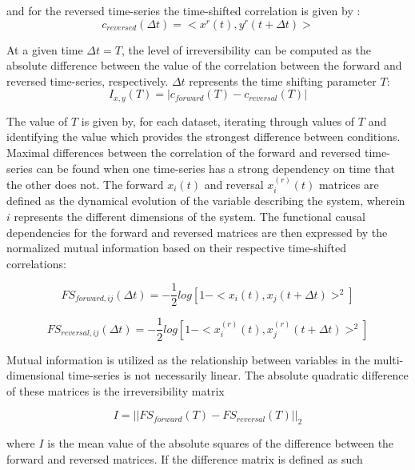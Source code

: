 and for the reversed time-series the time-shifted correlation is
given by \parencite{Deco2022, Kringelbach2023}: 
\begin{equation}
c_{reversed}(\Delta t) = <x^{r}(t),y^{r}(t+\Delta t)>
\end{equation}

At a given time \(\Delta t = T\), the level of irreversibility can be
computed as the absolute difference between the value of the correlation
between the forward and reversed time-series, respectively. \(\Delta t\)
represents the time shifting parameter \(T\):
\begin{equation}
I_{x,y}(T) = |c_{forward}(T) - c_{reversal}(T)|
\end{equation}

The value of \(T\) is given by, for each dataset, iterating through
values of \(T\) and identifying the value which provides the strongest
difference between conditions. Maximal differences between the
correlation of the forward and reversed time-series can be found when
one time-series has a strong dependency on time that the other does not.
The forward \(x_i(t)\) and reversal \(x^{(r)}_i(t)\) matrices are
defined as the dynamical evolution of the variable describing the
system, wherein \(i\) represents the different dimensions of the system.
The functional causal dependencies for the forward and reversed matrices
are then expressed by the normalized mutual information based on their
respective time-shifted correlations:


\begin{equation}
FS_{forward,ij}(\Delta t) = -\frac{1}{2}log[1-<x_i(t),x_j(t+\Delta t)>^2]
\end{equation}

\begin{equation}
FS_{reversal,ij}(\Delta t) = -\frac{1}{2}log[1-<x_i^{(r)}(t),x_j^{(r)}(t+\Delta t)>^2]
\end{equation}


Mutual information is utilized as the relationship between variables in
the multi-dimensional time-series is not necessarily linear. The
absolute quadratic difference of these matrices is the irreversibility
matrix


\begin{equation}
I=||FS_{forward}(T) - FS_{reversal}(T)||_2
\end{equation}


where \(I\) is the mean value of the absolute squares of the difference
between the forward and reversed matrices. If the difference matrix is
defined as such


